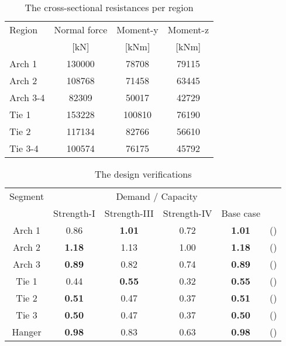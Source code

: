 \begin{table}[H] 
\caption{The cross-sectional resistances per region}
\centering
\begin{tabular}{lccc}
\hline
Region & Normal force & Moment-y & Moment-z \\
 & [kN]   & [kNm] & [kNm] \\ \hline
Arch 1 & \SI{130000}{} & \SI{78708}{} & \SI{79115}{}\\
Arch 2 & \SI{108768}{} & \SI{71458}{} & \SI{63445}{}\\
Arch 3-4 & \SI{82309}{} & \SI{50017}{} & \SI{42729}{}\\
Tie 1 & \SI{153228}{} & \SI{100810}{} & \SI{76190}{}\\
Tie 2 & \SI{117134}{} & \SI{82766}{} & \SI{56610}{}\\
Tie 3-4 & \SI{100574}{} & \SI{76175}{} & \SI{45792}{}\\ \hline
\end{tabular}
\end{table}

\begin{table}[H] 
\caption{The design verifications}
\centering
\begin{tabular}{cccccl}
\hline
Segment & \multicolumn{4}{c}{Demand / Capacity} & \\
 & Strength-I & Strength-III & Strength-IV & Base case & \\ \hline
Arch 1 & 0.86 & \textbf{1.01} & 0.72 & \textbf{1.01} & () \\
Arch 2 & \textbf{1.18} & 1.13 & 1.00 & \textbf{1.18} & () \\
Arch 3 & \textbf{0.89} & 0.82 & 0.74 & \textbf{0.89} & () \\
Tie 1 & 0.44 & \textbf{0.55} & 0.32 & \textbf{0.55} & () \\
Tie 2 & \textbf{0.51} & 0.47 & 0.37 & \textbf{0.51} & () \\
Tie 3 & \textbf{0.50} & 0.47 & 0.37 & \textbf{0.50} & () \\
Hanger & \textbf{0.98} & 0.83 & 0.63 & \textbf{0.98} & () \\
\hline
\end{tabular}

\end{table}


